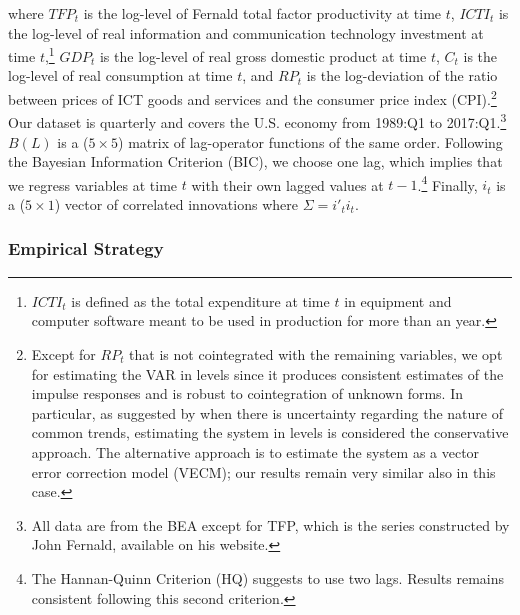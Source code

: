 \documentclass[12pt]{article}
\begin{document}
where $TFP_t$ is the log-level of Fernald total factor productivity at time $t$, $ICTI_{t}$ is the log-level of real information and communication technology investment at time $t$,\footnote{$ICTI_t$ is defined as the total expenditure at time $t$ in equipment and computer software meant to be used in production for more than an year.} $GDP_t$ is the log-level of real gross domestic product at time $t$, $C_t$ is the log-level of real consumption at time $t$, and $RP_t$ is the log-deviation of the ratio between prices of ICT goods and services and the consumer price index (CPI).\footnote{Except for $RP_t$ that is not cointegrated with the remaining variables, we opt for estimating the VAR in levels since it produces consistent estimates of the impulse responses and is robust to cointegration of unknown forms. In particular, as suggested by \cite{hamilton1994time} when there is uncertainty regarding the nature of common trends, estimating the system in levels is considered the conservative approach. The alternative approach is to estimate the system as a vector error correction model (VECM); our results remain very similar also in this case.} Our dataset is quarterly and covers the U.S. economy from 1989:Q1 to 2017:Q1.\footnote{All data are from the BEA except for TFP, which is the series constructed by John Fernald, available on his website.} $B(L)$ is a ($5\times 5$) matrix of lag-operator functions of the same order. Following the Bayesian Information Criterion (BIC), we choose one lag, which implies that we regress variables at time $t$ with their own lagged values at $t-1$.\footnote{The Hannan-Quinn Criterion (HQ) suggests to use two lags. Results remains consistent following this second criterion.} Finally, $i_t$ is a ($5 \times 1$) vector of correlated innovations where $\Sigma = i'_t i_t$.

\subsubsection{Empirical Strategy}\label{section:empiricalstrategy_simple}
\end{document}
